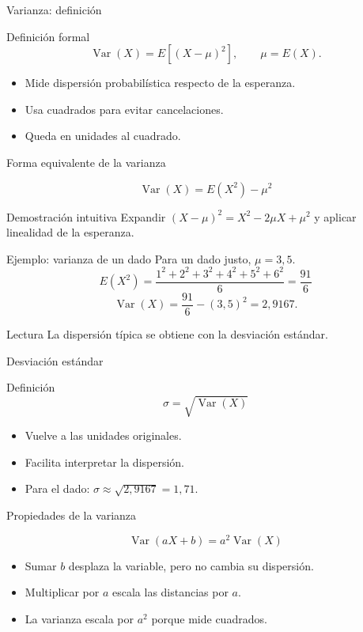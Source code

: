 \documentclass[aspectratio=169,11pt]{beamer}
\begin{document}
\begin{frame}{Varianza: definición}
\begin{block}{Definición formal}
\[
\operatorname{Var}(X)=E[(X-\mu)^2],\qquad \mu=E(X).
\]
\end{block}
\begin{itemize}
  \item Mide dispersión probabilística respecto de la esperanza.
  \item Usa cuadrados para evitar cancelaciones.
  \item Queda en unidades al cuadrado.
\end{itemize}
\end{frame}

\begin{frame}{Forma equivalente de la varianza}
\begin{theorem}
\[
\operatorname{Var}(X)=E(X^2)-\mu^2
\]
\end{theorem}
\begin{block}{Demostración intuitiva}
Expandir $(X-\mu)^2=X^2-2\mu X+\mu^2$ y aplicar linealidad de la esperanza.
\end{block}
\end{frame}

\begin{frame}{Ejemplo: varianza de un dado}
\small
Para un dado justo, $\mu=3{,}5$.
\[
E(X^2)=\frac{1^2+2^2+3^2+4^2+5^2+6^2}{6}=\frac{91}{6}
\]
\[
\operatorname{Var}(X)=\frac{91}{6}-(3{,}5)^2=2{,}9167.
\]
\begin{exampleblock}{Lectura}
La dispersión típica se obtiene con la desviación estándar.
\end{exampleblock}
\end{frame}

\begin{frame}{Desviación estándar}
\begin{block}{Definición}
\[
\sigma=\sqrt{\operatorname{Var}(X)}
\]
\end{block}
\begin{itemize}
  \item Vuelve a las unidades originales.
  \item Facilita interpretar la dispersión.
  \item Para el dado: $\sigma\approx\sqrt{2{,}9167}=1{,}71$.
\end{itemize}
\end{frame}

\begin{frame}{Propiedades de la varianza}
\begin{theorem}
\[
\operatorname{Var}(aX+b)=a^2\operatorname{Var}(X)
\]
\end{theorem}
\begin{itemize}
  \item Sumar $b$ desplaza la variable, pero no cambia su dispersión.
  \item Multiplicar por $a$ escala las distancias por $a$.
  \item La varianza escala por $a^2$ porque mide cuadrados.
\end{itemize}
\end{frame}
\end{document}
